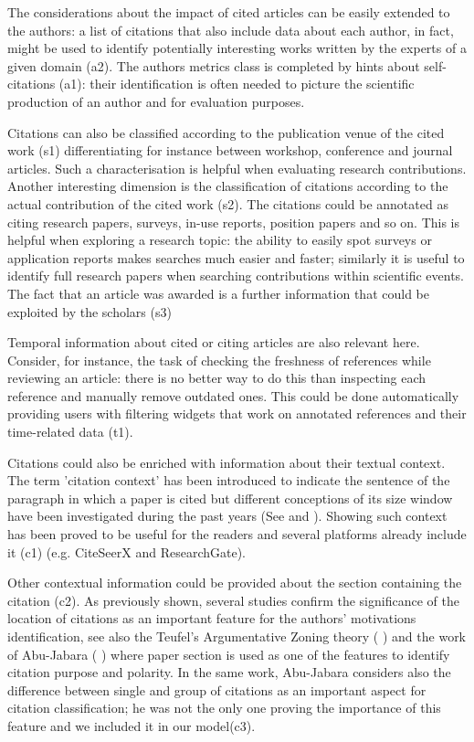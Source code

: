 \documentclass[runningheads,a4paper]{llncs}
\begin{document}
The considerations about the impact of cited articles can be easily extended to the authors: a list of citations that also include data about each author, in fact, might be used to identify potentially interesting works written by the experts of a given domain (a2). The authors metrics class is completed by hints about self-citations (a1): their identification is often needed to picture the scientific production of an author and for evaluation purposes.

Citations can also be classified according to the publication venue of the cited work (s1) differentiating for instance between workshop, conference and journal articles. Such a characterisation is helpful when evaluating research contributions. Another interesting dimension is the classification of citations according to the actual contribution of the cited work (s2). The citations could be annotated as citing research papers, surveys, in-use reports, position papers and so on. This is helpful when exploring a research topic: the ability to easily spot surveys or application reports makes searches much easier and faster; similarly it is useful to identify full research papers when searching contributions within scientific events. The fact that an article was awarded is a further information that could be exploited by the scholars (s3)

Temporal information about cited or citing articles are also relevant here. Consider, for instance, the task of checking the freshness of references while reviewing an article: there is no better way to do this than inspecting each reference and manually remove outdated ones. This could be done automatically providing users with filtering widgets that work on annotated references and their time-related data (t1).

Citations could also be enriched with information about their textual context. The term 'citation context' has been introduced to indicate the sentence of the paragraph in which a paper is cited but different conceptions of its size window have been investigated during the past years (See  \cite{__RefNumPara__4699_348126194} and  \cite{__RefNumPara__4701_348126194}). Showing such context has been proved to be useful for the readers and several platforms already include it (c1) (e.g. CiteSeerX and ResearchGate).

Other contextual information could be provided about the section containing the citation (c2). As previously shown, several studies confirm the significance of the location of citations as an important feature for the authors' motivations identification, see also the Teufel's Argumentative Zoning theory ( \cite{__RefNumPara__4703_348126194}) and the work of Abu-Jabara ( \cite{__RefNumPara__3096_348126194}) where paper section is used as one of the features to identify citation purpose and polarity. In the same work, Abu-Jabara considers also the difference between single and group of citations as an important aspect for citation classification; he was not the only one proving the importance of this feature and we included it in our model(c3).
\end{document}
